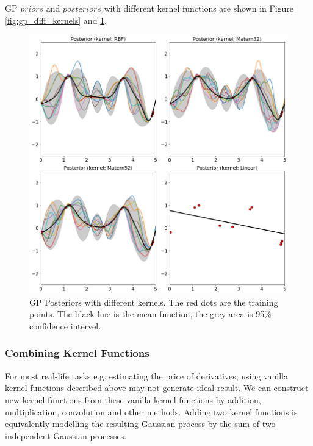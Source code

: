 \documentclass[11pt,a4paper]{article}
\theoremstyle{definition}
\numberwithin{equation}{section}
\begin{document}
	GP $priors$ and $posteriors$ with different kernel functions are shown in Figure \ref{fig:gp_diff_kernels} and \ref{fig:gp_diff_kernels_2}.
	
	\begin{figure}[h!]
		\centering
		\includegraphics[width=.9\linewidth]{posterior_diff_kernels.png}
		\caption{GP Posteriors with different kernels. The red dots are the training points. The black line is the mean function, the grey area is 95\% confidence intervel.}
		\label{fig:gp_diff_kernels_2}
	\end{figure}
	
	\subsubsection*{Combining Kernel Functions}
	For most real-life tasks e.g. estimating the price of derivatives, using vanilla kernel functions described above may not generate ideal result. We can construct new kernel functions from these vanilla kernel functions by addition, multiplication, convolution and other methods. Adding two kernel functions is equivalently modelling the resulting Gaussian process by the sum of two independent Gaussian processes\cite[Rasmussen and Williams, sec 4.2]{RandW}.
	
\end{document}
